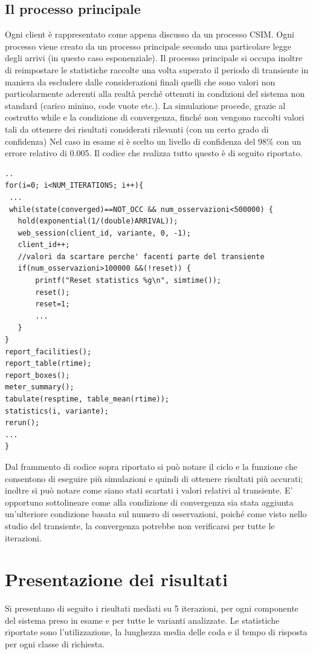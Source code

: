 \subsection{Il processo principale}
Ogni client è rappresentato come appena discusso da un processo CSIM. Ogni processo viene 
creato da un processo principale secondo una particolare legge degli arrivi (in questo caso 
esponenziale). Il processo principale si occupa inoltre di reimpostare le statistiche raccolte una volta 
superato il periodo di transiente in maniera da escludere dalle considerazioni finali quelli che sono valori non particolarmente aderenti alla realtà perché ottenuti in condizioni del sistema non standard (carico minino, code vuote etc.). 
La simulazione procede, grazie al costrutto while e la condizione di convergenza, finché non 
vengono raccolti valori tali da ottenere dei risultati considerati rilevanti (con un certo grado di confidenza) Nel caso in esame si è scelto un livello di confidenza del 98\% con un errore relativo  di 0.005.
Il codice che realizza tutto questo è di seguito riportato. 
\begin{lstlisting}
..
for(i=0; i<NUM_ITERATIONS; i++){
 ...
 while(state(converged)==NOT_OCC && num_osservazioni<500000) { 
   hold(exponential(1/(double)ARRIVAL)); 
   web_session(client_id, variante, 0, -1); 
   client_id++; 
   //valori da scartare perche' facenti parte del transiente
   if(num_osservazioni>100000 &&(!reset)) { 
       printf("Reset statistics %g\n", simtime()); 
       reset(); 
       reset=1; 
       ...
   } 
} 
report_facilities(); 
report_table(rtime); 
report_boxes(); 
meter_summary(); 
tabulate(resptime, table_mean(rtime)); 
statistics(i, variante); 
rerun();
...
}
\end{lstlisting}
Dal frammento di codice sopra riportato si può notare il ciclo  e la funzione  che consentono di eseguire più simulazioni e quindi di ottenere risultati più accurati; inoltre si può notare come siano stati scartati i valori relativi al transiente. E' opportuno sottolineare come alla condizione di convergenza sia stata aggiunta un'ulteriore condizione basata sul numero di osservazioni, poiché come visto nello studio del transiente, la convergenza potrebbe non verificarsi per tutte le iterazioni.

\section{Presentazione dei risultati}
Si presentano di seguito i risultati mediati su 5 iterazioni, per ogni componente del sistema preso in esame e per tutte le varianti analizzate. Le statistiche riportate sono l'utilizzazione, la lunghezza media delle coda e il tempo di risposta per ogni classe di richiesta.
